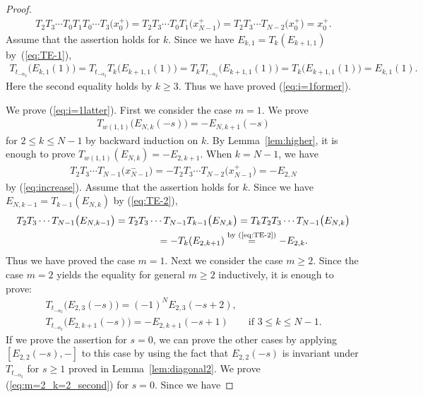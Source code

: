 \begin{proof}
\begin{gather*}
T_2 T_3 \cdots T_0 T_1 T_0 \cdots T_3\big(x_0^+\big) = T_2 T_3 \cdots T_0 T_1 \big(x_{N-1}^+\big) = T_2 T_3 \cdots T_{N-2} \big(x_0^+\big) = x_0^+.
\end{gather*}
Assume that the assertion holds for $k$. Since we have $E_{k,1} = T_k(E_{k+1,1})$ by~(\ref{eq:TE-1}),
\begin{gather*}
T_{t_{-\alpha_2}}\big(E_{k,1}(1)\big) = T_{t_{-\alpha_2}} T_{k}\big(E_{k+1,1}(1)\big) = T_{k} T_{t_{-\alpha_2}}\big(E_{k+1,1}(1)\big) = T_k \big(E_{k+1,1}(1)\big) = E_{k,1}(1).
\end{gather*}
Here the second equality holds by $k \geq 3$. Thus we have proved (\ref{eq:i=1former}).

We prove (\ref{eq:i=1latter}). First we consider the case $m=1$. We prove
\begin{gather*}
T_{w(1,1)} \big(E_{N,k}(-s)\big)=-E_{N,k+1}(-s)
\end{gather*}
for $2 \leq k \leq N-1$ by backward induction on $k$. By Lemma~\ref{lem:higher}, it is enough to prove $T_{w(1,1)}(E_{N,k})=-E_{2,k+1}$. When $k=N-1$, we have
\begin{gather*}
T_2 T_3 \cdots T_{N-1}\big(x_{N-1}^-\big) = -T_2 T_3 \cdots T_{N-2}\big(x_{N-1}^+\big) = -E_{2,N}
\end{gather*}
by (\ref{eq:increase}). Assume that the assertion holds for $k$. Since we have $E_{N,k-1}=T_{k-1}(E_{N,k})$ by (\ref{eq:TE-2}),
\begin{gather*}
T_2 T_3 \cdots T_{N-1}\big(E_{N,k-1}\big) = T_2 T_3 \cdots T_{N-1} T_{k-1}\big(E_{N,k}\big) = T_k T_2 T_3 \cdots T_{N-1} \big(E_{N,k}\big)\\
\hphantom{T_2 T_3 \cdots T_{N-1}\big(E_{N,k-1}\big)}{} = -T_k(E_{2,k+1}) \overset{\text{by (\ref{eq:TE-2})}}{=} -E_{2,k}.
\end{gather*}
Thus we have proved the case $m=1$. Next we consider the case $m \geq 2$. Since the case $m=2$ yields the equality for general $m \geq 2$ inductively, it is enough to prove:
\begin{gather}
T_{t_{-\alpha_2}}\big(E_{2,3}(-s)\big) = (-1)^N E_{2,3}(-s+2), \label{eq:m=2_k=2_second}\\
T_{t_{-\alpha_2}}\big(E_{2,k+1}(-s)\big) = -E_{2,k+1}(-s+1) \qquad \text{if $3 \leq k \leq N-1$}. \label{eq:m=2_k+1_second}
\end{gather}
If we prove the assertion for $s=0$, we can prove the other cases by applying $[E_{2,2}(-s),-]$ to this case by using the fact that $E_{2,2}(-s)$ is invariant under $T_{t_{-\alpha_2}}$ for $s \geq 1$ proved in Lemma~\ref{lem:diagonal2}. We prove (\ref{eq:m=2_k=2_second}) for $s=0$. Since we have

\end{proof}
